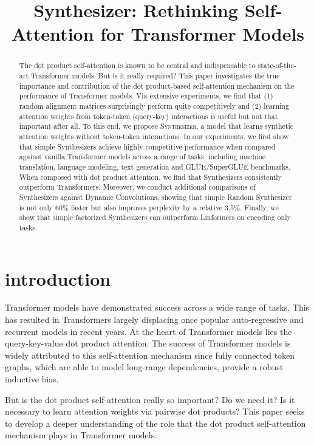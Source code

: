 \title{Synthesizer: Rethinking Self-Attention for Transformer Models}

\begin{abstract}
The dot product self-attention is known to be central and indispensable to state-of-the-art Transformer models. But is it really required? This paper investigates the true importance and contribution of the dot product-based self-attention mechanism on the performance of Transformer models. Via extensive experiments, we find that (1) random alignment matrices surprisingly perform quite competitively and (2) learning attention weights from token-token (query-key) interactions is useful but not that important after all. To this end, we propose \textsc{Synthesizer}, a model that learns synthetic attention weights without token-token interactions. In our experiments, we first show that simple Synthesizers achieve highly competitive performance when compared against vanilla Transformer models across a range of tasks, including machine translation, language modeling, text generation and GLUE/SuperGLUE benchmarks. When composed with dot product attention, we find that Synthesizers consistently outperform Transformers. Moreover, we conduct additional comparisons of Synthesizers against Dynamic Convolutions, showing that simple Random Synthesizer is not only $60\%$ faster but also improves perplexity by a relative $3.5\%$. Finally, we show that simple factorized Synthesizers can outperform Linformers on encoding only tasks.
\end{abstract}

\section{introduction}

Transformer models \citep{vaswani2017attention} have demonstrated success across a wide range of tasks. This has resulted in Transformers largely displacing once popular auto-regressive and recurrent models in recent years. At the heart of Transformer models lies the query-key-value dot product attention.  The success of Transformer models is widely attributed to this self-attention mechanism since fully connected token graphs, which are able to model long-range dependencies, provide a robust inductive bias.

But is the dot product self-attention really so important? Do we need it? Is it necessary to learn attention weights  via pairwise dot products? This paper seeks to develop a deeper understanding of the role that the dot product self-attention mechanism plays in Transformer models. 

